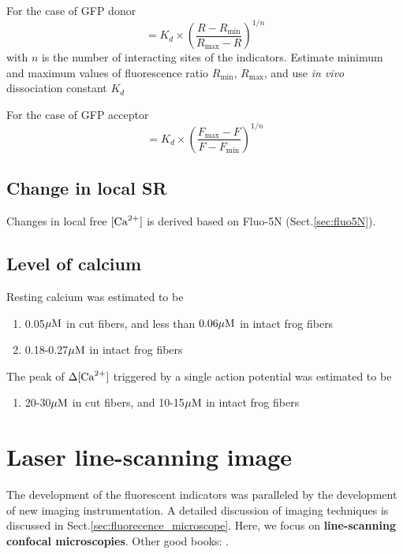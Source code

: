 For the case of GFP donor
\begin{equation}
[\Ca] = K_d \times (\frac{R-R_\min}{R_\max-R})^{1/n}
\end{equation}
with $n$ is the number of interacting sites of the indicators. Estimate minimum
and maximum values of fluorescence ratio $R_\min$, $R_\max$, and use {\it in
vivo} dissociation constant $K_d$

For the case of GFP acceptor
\begin{equation}
[\Ca] = K_d \times (\frac{F_\max - F}{F - F_\min})^{1/n}
\end{equation}

\subsection{Change in local SR}

Changes in local free $[{\text{Ca}^{2+}}]$ is derived based on Fluo-5N
(Sect.\ref{sec:fluo5N}).

\subsection{Level of calcium}


Resting calcium was estimated to be
\begin{enumerate}
  \item 0.05${\mu\text{M}}$ in cut fibers, and less than $0.06{\mu\text{M}}$ in intact frog fibers
  \citep{kurebayashi1993}
  \item 0.18-0.27${\mu\text{M}}$ in intact frog fibers \citep{kurebayashi1993}
\end{enumerate}

The peak of $\Delta [{\text{Ca}^{2+}}]$ triggered by a single action potential was estimated
to be
\begin{enumerate}
  \item 20-30${\mu\text{M}}$ in cut fibers, and 10-15${\mu\text{M}}$ in intact frog fibers
  \citep{kurebayashi1993}
\end{enumerate}

\section{Laser line-scanning image}
\label{sec:confocal-line-scan}

The development of the fluorescent indicators was paralleled by the development
of new imaging instrumentation. A detailed discussion of imaging techniques is
discussed in Sect.\ref{sec:fluorecence_microscope}.  Here, we focus on
{\bf line-scanning confocal microscopies}. Other good books:
\citep{price2011bcm}.


